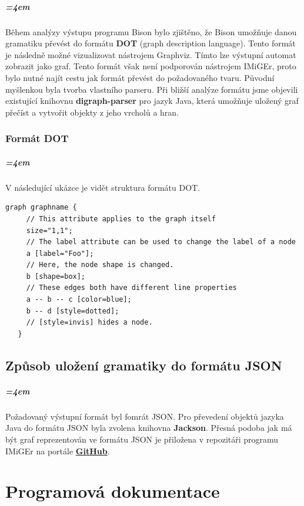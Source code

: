 \documentclass[
12pt,
a4paper,
pdftex,
czech,
titlepage
]{report}
\begin{document}
\paragraph{\parindent=4em}{
Během analýzy výstupu programu Bison bylo zjištěno, že Bison umožňuje danou gramatiku převést do formátu \textbf{DOT} (graph description language). Tento formát je následně možné vizualizovat nástrojem Graphviz. Tímto lze výstupní automat zobrazit jako graf. Tento formát však není podporován nástrojem IMiGEr, proto bylo nutné najít cestu jak formát převést do požadovaného tvaru. Původní myšlenkou byla tvorba vlastního parseru. Při bližší analýze formátu jsme objevili existující knihovnu \textbf{digraph-parser} pro jazyk Java, která umožňuje uložený graf přečíst a vytvořit objekty z jeho vrcholů a hran.
}
\subsection{Formát DOT}
\paragraph{\parindent=4em}{
V následující ukázce je vidět struktura formátu DOT.
}
\begin{lstlisting}
graph graphname {
     // This attribute applies to the graph itself
     size="1,1";
     // The label attribute can be used to change the label of a node
     a [label="Foo"];
     // Here, the node shape is changed.
     b [shape=box];
     // These edges both have different line properties
     a -- b -- c [color=blue];
     b -- d [style=dotted];
     // [style=invis] hides a node.
   }
\end{lstlisting}   

\section{Způsob uložení gramatiky do formátu JSON}
\paragraph{\parindent=4em}{
Požadovaný výstupní formát byl fomrát JSON. Pro převedení objektů jazyka Java do formátu JSON byla zvolena knihovna \textbf{Jackson}. Přesná podoba jak má být graf reprezentován ve formátu JSON je přiložena v repozitáři programu IMiGEr na portále \textbf{\href{https://github.com/ReliSA/IMiGEr/blob/master/documents/IMiGEr/IMiGEr\_raw\_input\_format.pdf}{GitHub}}.
}

\chapter{Programová dokumentace}
\end{document}
